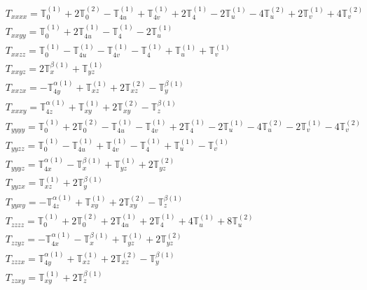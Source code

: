 \documentclass[fleqn,8pt,landscape]{jsarticle}
\begin{document}
\begin{align*}
& T_{xxxx} = \mathbb{T}_{0}^{(1)} + 2 \mathbb{T}_{0}^{(2)} - \mathbb{T}_{4u}^{(1)} + \mathbb{T}_{4v}^{(1)} + 2 \mathbb{T}_{4}^{(1)} - 2 \mathbb{T}_{u}^{(1)} - 4 \mathbb{T}_{u}^{(2)} + 2 \mathbb{T}_{v}^{(1)} + 4 \mathbb{T}_{v}^{(2)} \\
& T_{xxyy} = \mathbb{T}_{0}^{(1)} + 2 \mathbb{T}_{4u}^{(1)} - \mathbb{T}_{4}^{(1)} - 2 \mathbb{T}_{u}^{(1)} \\
& T_{xxzz} = \mathbb{T}_{0}^{(1)} - \mathbb{T}_{4u}^{(1)} - \mathbb{T}_{4v}^{(1)} - \mathbb{T}_{4}^{(1)} + \mathbb{T}_{u}^{(1)} + \mathbb{T}_{v}^{(1)} \\
& T_{xxyz} = 2 \mathbb{T}_{x}^{\beta(1)} + \mathbb{T}_{yz}^{(1)} \\
& T_{xxzx} = - \mathbb{T}_{4y}^{\alpha(1)} + \mathbb{T}_{xz}^{(1)} + 2 \mathbb{T}_{xz}^{(2)} - \mathbb{T}_{y}^{\beta(1)} \\
& T_{xxxy} = \mathbb{T}_{4z}^{\alpha(1)} + \mathbb{T}_{xy}^{(1)} + 2 \mathbb{T}_{xy}^{(2)} - \mathbb{T}_{z}^{\beta(1)} \\
& T_{yyyy} = \mathbb{T}_{0}^{(1)} + 2 \mathbb{T}_{0}^{(2)} - \mathbb{T}_{4u}^{(1)} - \mathbb{T}_{4v}^{(1)} + 2 \mathbb{T}_{4}^{(1)} - 2 \mathbb{T}_{u}^{(1)} - 4 \mathbb{T}_{u}^{(2)} - 2 \mathbb{T}_{v}^{(1)} - 4 \mathbb{T}_{v}^{(2)} \\
& T_{yyzz} = \mathbb{T}_{0}^{(1)} - \mathbb{T}_{4u}^{(1)} + \mathbb{T}_{4v}^{(1)} - \mathbb{T}_{4}^{(1)} + \mathbb{T}_{u}^{(1)} - \mathbb{T}_{v}^{(1)} \\
& T_{yyyz} = \mathbb{T}_{4x}^{\alpha(1)} - \mathbb{T}_{x}^{\beta(1)} + \mathbb{T}_{yz}^{(1)} + 2 \mathbb{T}_{yz}^{(2)} \\
& T_{yyzx} = \mathbb{T}_{xz}^{(1)} + 2 \mathbb{T}_{y}^{\beta(1)} \\
& T_{yyxy} = - \mathbb{T}_{4z}^{\alpha(1)} + \mathbb{T}_{xy}^{(1)} + 2 \mathbb{T}_{xy}^{(2)} - \mathbb{T}_{z}^{\beta(1)} \\
& T_{zzzz} = \mathbb{T}_{0}^{(1)} + 2 \mathbb{T}_{0}^{(2)} + 2 \mathbb{T}_{4u}^{(1)} + 2 \mathbb{T}_{4}^{(1)} + 4 \mathbb{T}_{u}^{(1)} + 8 \mathbb{T}_{u}^{(2)} \\
& T_{zzyz} = - \mathbb{T}_{4x}^{\alpha(1)} - \mathbb{T}_{x}^{\beta(1)} + \mathbb{T}_{yz}^{(1)} + 2 \mathbb{T}_{yz}^{(2)} \\
& T_{zzzx} = \mathbb{T}_{4y}^{\alpha(1)} + \mathbb{T}_{xz}^{(1)} + 2 \mathbb{T}_{xz}^{(2)} - \mathbb{T}_{y}^{\beta(1)} \\
& T_{zzxy} = \mathbb{T}_{xy}^{(1)} + 2 \mathbb{T}_{z}^{\beta(1)} \\

\end{align*}
\end{document}
